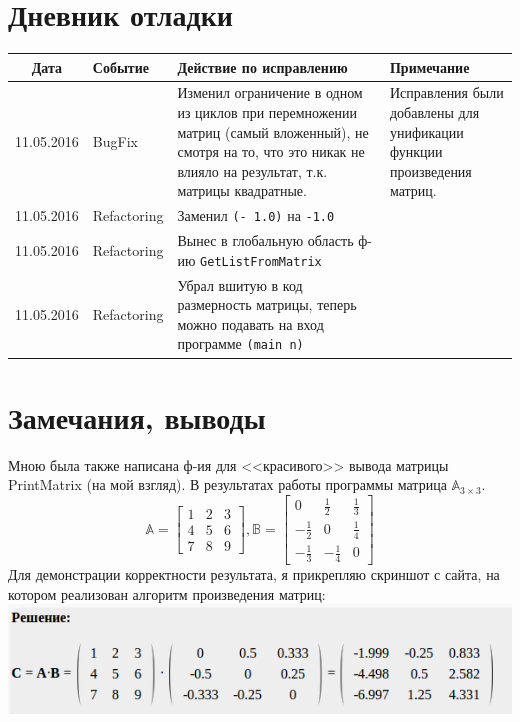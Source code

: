 \documentclass[12pt]{article}
\begin{document}
\section{Дневник отладки}
\begin{tabular}{|c|p{5cm}|p{5cm}|p{3cm}|}
\hline
Дата & Событие & Действие по исправлению & Примечание \\
\hline
11.05.2016 & BugFix & Изменил ограничение в одном из циклов при перемножении матриц (самый вложенный), не смотря на то, что это никак не влияло на результат, т.к. матрицы квадратные. & Исправления были добавлены для унификации функции произведения матриц. \\
11.05.2016 & Refactoring & Заменил {\color{red}\tt{(- 1.0)}} на {\color{green}\tt{-1.0}} &  \\
11.05.2016 & Refactoring & Вынес в глобальную область ф-ию {\color{red}\tt{GetListFromMatrix}} & \\
11.05.2016 & Refactoring & Убрал вшитую в код размерность матрицы, теперь можно подавать на вход программе \tt{(main n)} &  \\
\hline 
\end{tabular}

\section{Замечания, выводы}
Мною была также написана ф-ия для <<красивого>> вывода матрицы {\color{red} PrintMatrix} (на мой взгляд). В результатах работы программы матрица $\mathbb{A}_{3\times3}$. 
\[
\mathbb{A}=\begin{bmatrix}
			1 & 2 & 3\\
			4 & 5 & 6\\
			7 & 8 & 9
			\end{bmatrix}
,
\mathbb{B}=\begin{bmatrix}
			0 & \frac{1}{2} & \frac{1}{3}\\
			-\frac{1}{2} & 0 & \frac{1}{4}\\
			-\frac{1}{3} & -\frac{1}{4} & 0
			\end{bmatrix}
\]
Для демонстрации корректности результата, я прикрепляю скриншот с сайта, на котором реализован алгоритм произведения матриц:\\
\includegraphics[scale=0.5]{lr3Prove}
\end{document}
